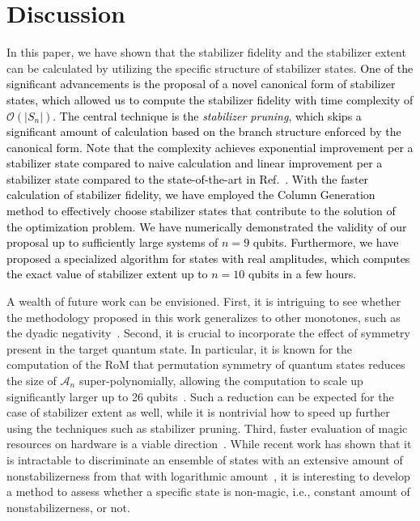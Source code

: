 \documentclass[aps,prx,onecolumn,superscriptaddress,nobibnotes,nofootinbib]{revtex4-2}
\newcommand{\black}[1]{\textcolor{black}{#1}}
\begin{document}
\section{Discussion}
\label{sec:discussion}

In this paper, we have shown that the stabilizer fidelity and the stabilizer extent can be calculated by utilizing the specific structure of stabilizer states.
\black{One of the significant advancements is the proposal of a novel canonical form of stabilizer states, which allowed us to compute the stabilizer fidelity with time complexity of $\mathcal{O}(|S_n|)$. The central technique is the \textit{stabilizer pruning}, which skips a significant amount of calculation based on the branch structure enforced by the canonical form. Note that the complexity achieves exponential improvement per a stabilizer state compared to naive calculation and linear improvement per a stabilizer state compared to the state-of-the-art in Ref.~\cite{Hamaguchi2024handbookquantifying}.
  With the faster calculation of stabilizer fidelity, we have employed the Column Generation method to effectively choose stabilizer states that contribute to the solution of the optimization problem.
  We have numerically demonstrated the validity of our proposal up to sufficiently large systems of $n=9$ qubits. Furthermore, we have proposed a specialized algorithm for states with real amplitudes, which computes the exact value of stabilizer extent up to $n=10$ qubits in a few hours.}

A wealth of future work can be envisioned. First, it is intriguing to see whether the methodology proposed in this work generalizes to other monotones, such as the dyadic negativity~\cite{seddonQuantifyingQuantumSpeedups2021}.
Second, it is crucial to incorporate the effect of symmetry present in the target quantum state.
In particular, it is known for the computation of the RoM that permutation symmetry of quantum states reduces the size of  $\mathcal{A}_n$ super-polynomially, allowing the computation to scale up significantly larger up to 26 qubits~\cite{heinrichRobustnessMagicSymmetries2019}. Such a reduction can be expected for the case of stabilizer extent as well, while it is nontrivial how to speed up further using the techniques such as stabilizer pruning.
Third, faster evaluation of magic resources on hardware is a viable direction~\cite{oliviero2022measuring, haug2023scalable}. While recent work has shown that it is intractable to discriminate an ensemble of states with an extensive amount of nonstabilizerness from that with logarithmic amount~\cite{gu2024pseudomagic}, it is interesting to develop a method to assess whether a specific state is non-magic, i.e., constant amount of nonstabilizerness, or not.
\end{document}
